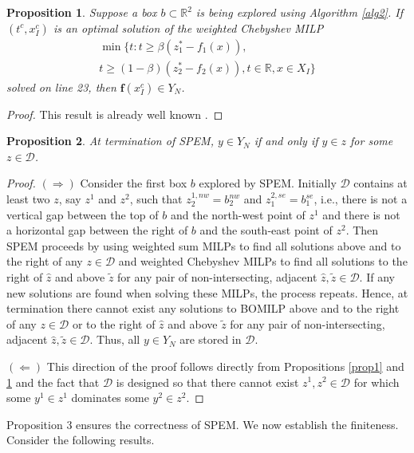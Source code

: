 \documentclass[12pt]{article}
\newtheorem{prop}{Proposition}
\newcommand{\R}{\mathbb{R}}
\newcommand{\objf}{\boldsymbol{f}}
\begin{document}
\begin{prop}\label{prop2}
Suppose a box $b \subset \R^2$ is being explored using Algorithm \ref{alg2}. If $(t^c,x_I^c)$ is an optimal solution of the weighted Chebyshev MILP 
\begin{multline*}
\min\{t: t \geq \beta(z^*_1-f_1(x)),\\ t \geq (1-\beta)(z^*_2-f_2(x)), t \in \R, x \in X_I\}
\end{multline*} solved on line 23, then $\objf(x_I^c) \in Y_N$.
\end{prop}

\begin{proof}
This result is already well known \citep{bowman1976}.
\end{proof}

\begin{prop}\label{prop3}
At termination of SPEM, $y \in Y_N$ if and only if $y \in z$ for some $z \in \mathscr{D}$. 
\end{prop}

\begin{proof}
$(\Rightarrow)$ Consider the first box $b$ explored by SPEM. Initially $\mathscr{D}$ contains at least two $z$, say $z^1$ and $z^2$, such that $z^{1,nw}_2 = b^{nw}_2$ and $z^{2,se}_1 = b^{se}_1$, i.e., there is not a vertical gap between the top of $b$ and the north-west point of $z^1$ and there is not a horizontal gap between the right of $b$ and the south-east point of $z^2$. Then SPEM proceeds by using weighted sum MILPs to find all solutions above and to the right of any $z \in \mathscr{D}$ and weighted Chebyshev MILPs to find all solutions to the right of $\hat{z}$ and above $\tilde{z}$ for any pair of non-intersecting, adjacent $\hat{z},\tilde{z} \in \mathscr{D}$. If any new solutions are found when solving these MILPs, the process repeats. Hence, at termination there cannot exist any solutions to BOMILP above and to the right of any $z \in \mathscr{D}$ or to the right of $\hat{z}$ and above $\tilde{z}$ for any pair of non-intersecting, adjacent $\hat{z},\tilde{z} \in \mathscr{D}$. Thus, all $y \in Y_N$ are stored in $\mathscr{D}$.

$(\Leftarrow)$
This direction of the proof follows directly from Propositions \ref{prop1} and \ref{prop2} and the fact that $\mathscr{D}$ is designed so that there cannot exist $z^1, z^2 \in \mathscr{D}$ for which some $y^1 \in z^1$ dominates some $y^2 \in z^2$.
\end{proof}

Proposition 3 ensures the correctness of SPEM. We now establish the finiteness. Consider the following results.
\end{document}
